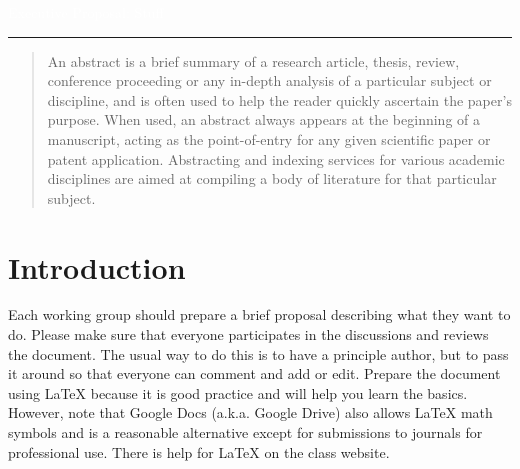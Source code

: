 \documentclass[a4paper]{article}
\author{%
    Author 1 name \\
    Division name \\
    \texttt{email1@example.com}
    \vspace{40pt} \\ %
    Author 2 name \\
    Division name \\
    \texttt{email2@example.com} %
    }
\makeatletter
\def\printauthor{%
    {\large \@author}}
\makeatother
\begin{document}
\begin{titlepage}
\BgThispage
{}
\vspace*{0.4\textheight}
\noindent
\textcolor{white}{\Huge\textsf{
Executive Proposal: Stuff %
}}\vspace*{2cm}\par
\noindent
\begin{minipage}{0.35\linewidth}
    \begin{flushright}
        \printauthor
    \end{flushright}
\end{minipage} \hspace{15pt}
%
\begin{minipage}{0.02\linewidth}
    \rule{1pt}{175pt}
\end{minipage} \hspace{-10pt}
%
\begin{minipage}{0.63\linewidth}
\vspace{5pt}
    \begin{abstract} 
An abstract is a brief summary of a research article, thesis, review, conference proceeding or any in-depth analysis of a particular subject or discipline, and is often used to help the reader quickly ascertain the paper's purpose. When used, an abstract always appears at the beginning of a manuscript, acting as the point-of-entry for any given scientific paper or patent application. Abstracting and indexing services for various academic disciplines are aimed at compiling a body of literature for that particular subject.
    \end{abstract}
\end{minipage}
\end{titlepage}
\restoregeometry


\section{Introduction}

Each working group should prepare a brief proposal describing what they want 
to do.  Please make sure that everyone participates in the discussions and
reviews the document.  The usual way to do this is to have a principle author,
but to pass it around so that everyone can comment and add or edit.  Prepare the
document using \LaTeX\/ because it is good practice and will help you learn the
basics.  However, note that Google Docs (a.k.a. Google Drive) also allows
\LaTeX\/ math symbols and is a reasonable alternative except for submissions
to journals for professional use.  There is help for \LaTeX\/ on the
class website.
\end{document}
